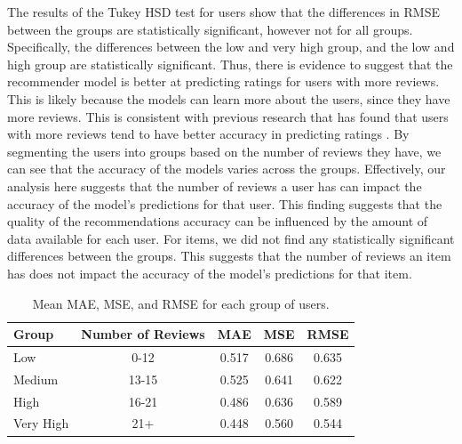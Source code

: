 The results of the Tukey HSD test for users show that the differences in RMSE between the groups are statistically significant, however not for all groups. Specifically, the differences between the low and very high group, and the low and high group are statistically significant. Thus, there is evidence to suggest that the recommender model is better at predicting ratings for users with more reviews. This is likely because the models can learn more about the users, since they have more reviews. This is consistent with previous research that has found that users with more reviews tend to have better accuracy in predicting ratings \cite{srifi2020recommender}. By segmenting the users into groups based on the number of reviews they have, we can see that the accuracy of the models varies across the groups. Effectively, our analysis here suggests that the number of reviews a user has can impact the accuracy of the model's predictions for that user. This finding suggests that the quality of the recommendations accuracy can be influenced by the amount of data available for each user. For items, we did not find any statistically significant differences between the groups. This suggests that the number of reviews an item has does not impact the accuracy of the model's predictions for that item.


\begin{table}[htbp]
    \centering
    \begin{tabular}{lcccc}
        \toprule
        \textbf{Group} & \textbf{Number of Reviews}&\textbf{MAE} & \textbf{MSE} & \textbf{RMSE} \\
        \midrule
        Low & 0-12                &             0.517 &             0.686 &              0.635 \\

        Medium & 13-15               &             0.525 &             0.641  &              0.622 \\

        High & 16-21               &             0.486 &             0.636 &              0.589 \\

        Very High & 21+                 &             0.448 &             0.560 &              0.544 \\

        \bottomrule
    \end{tabular}
    \caption{Mean MAE, MSE, and RMSE for each group of users.}
    \label{tab:summary_stats_users}
\end{table}

